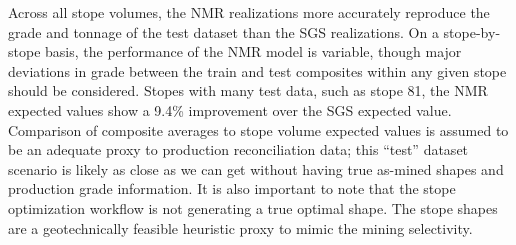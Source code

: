 Across all stope volumes, the \gls{NMR} realizations more accurately reproduce the grade and tonnage of the test dataset than the \gls{SGS} realizations. On a stope-by-stope basis, the performance of the \gls{NMR} model is variable, though major deviations in grade between the train and test composites within any given stope should be considered. Stopes with many test data, such as stope 81, the \gls{NMR} expected values show a 9.4\% improvement over the \gls{SGS} expected value. Comparison of composite averages to stope volume expected values is assumed to be an adequate proxy to production reconciliation data; this ``test'' dataset scenario is likely as close as we can get without having true as-mined shapes and production grade information. It is also important to note that the stope optimization workflow is not generating a true optimal shape. The stope shapes are a geotechnically feasible heuristic proxy to mimic the mining selectivity.


